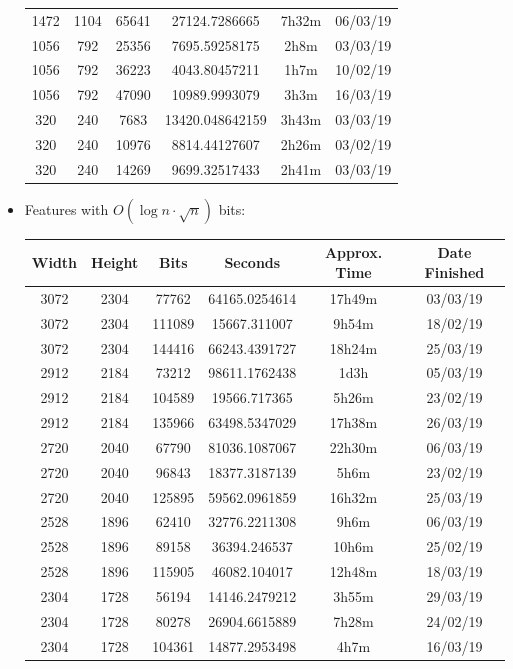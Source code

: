 \documentclass[11pt,a4paper]{report}
\begin{document}
\begin{itemize}
\begin{center}
\begin{tabular}{ c c c | c c c }
  1472 & 1104 & 65641 & 27124.7286665 & 7h32m & 06/03/19 \\
  1056 & 792 & 25356 & 7695.59258175 & 2h8m & 03/03/19 \\
  1056 & 792 & 36223 & 4043.80457211 & 1h7m & 10/02/19 \\
  1056 & 792 & 47090 & 10989.9993079 & 3h3m & 16/03/19 \\
  320 & 240 & 7683 & 13420.048642159 & 3h43m & 03/03/19 \\
  320 & 240 & 10976 & 8814.44127607 & 2h26m & 03/02/19 \\
  320 & 240 & 14269 & 9699.32517433 & 2h41m & 03/03/19 \\
  \end{tabular}
  \end{center}

\newpage
\item Features with $O(\log{n} \cdot \sqrt{n})$ bits:
  \begin{center}
  \begin{tabular}{ c c c | c c c }
  Width & Height & Bits & Seconds & Approx. Time & Date Finished \\ \hline
  3072 & 2304 & 77762 & 64165.0254614 & 17h49m & 03/03/19 \\
  3072 & 2304 & 111089 & 15667.311007 & 9h54m & 18/02/19 \\
  3072 & 2304 & 144416 & 66243.4391727 & 18h24m & 25/03/19 \\
  2912 & 2184 & 73212 & 98611.1762438 & 1d3h & 05/03/19 \\
  2912 & 2184 & 104589 & 19566.717365 & 5h26m & 23/02/19 \\
  2912 & 2184 & 135966 & 63498.5347029 & 17h38m & 26/03/19 \\
  2720 & 2040 & 67790 & 81036.1087067 & 22h30m & 06/03/19 \\
  2720 & 2040 & 96843 & 18377.3187139 & 5h6m & 23/02/19 \\
  2720 & 2040 & 125895 & 59562.0961859 & 16h32m & 25/03/19 \\
  2528 & 1896 & 62410 & 32776.2211308 & 9h6m & 06/03/19 \\
  2528 & 1896 & 89158 & 36394.246537 & 10h6m & 25/02/19 \\
  2528 & 1896 & 115905 & 46082.104017 & 12h48m & 18/03/19 \\
  2304 & 1728 & 56194 & 14146.2479212 & 3h55m & 29/03/19 \\
  2304 & 1728 & 80278 & 26904.6615889 & 7h28m & 24/02/19 \\
  2304 & 1728 & 104361 & 14877.2953498 & 4h7m & 16/03/19 \\

\end{tabular}
\end{center}
\end{itemize}
\end{document}
